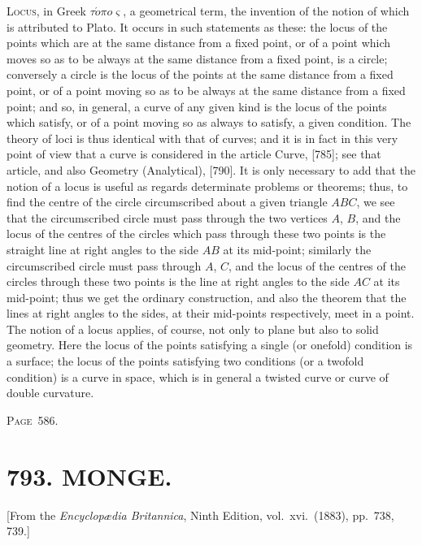 \documentclass[11pt,a4paper]{book}
\begin{document}
\textsc{Locus}, in Greek $\tau\acute{o}\pi o\varsigma$, a geometrical term, the invention of the notion of which is attributed to Plato. It occurs in such statements as these: the locus of the points which are at the same distance from a fixed point, or of a point which moves so as to be always at the same distance from a fixed point, is a circle; conversely a circle is the locus of the points at the same distance from a fixed point, or of a point moving so as to be always at the same distance from a fixed point; and so, in general, a curve of any given kind is the locus of the points which satisfy, or of a point moving so as always to satisfy, a given condition. The theory of loci is thus identical with that of curves; and it is in fact in this very point of view that a curve is considered in the article Curve, [785]; see that article, and also Geometry (Analytical), [790]. It is only necessary to add that the notion of a locus is useful as regards determinate problems or theorems; thus, to find the centre of the circle circumscribed about a given triangle $ABC$, we see that the circumscribed circle must pass through the two vertices $A$, $B$, and the locus of the centres of the circles which pass through these two points is the straight line at right angles to the side $AB$ at its mid-point; similarly the circumscribed circle must pass through $A$, $C$, and the locus of the centres of the circles through these two points is the line at right angles to the side $AC$ at its mid-point; thus we get the ordinary construction, and also the theorem that the lines at right angles to the sides, at their mid-points respectively, meet in a point. The notion of a locus applies, of course, not only to plane but also to solid geometry. Here the locus of the points satisfying a single (or onefold) condition is a surface; the locus of the points satisfying two conditions (or a twofold condition) is a curve in space, which is in general a twisted curve or curve of double curvature.

\newpage
\noindent\textsc{Page~586.}

\section*{793. MONGE.}

\begin{flushright}
\small[From the \textit{Encyclop{\ae}dia Britannica}, Ninth Edition, vol.~xvi.~(1883), pp.~738, 739.]
\end{flushright}
\end{document}
